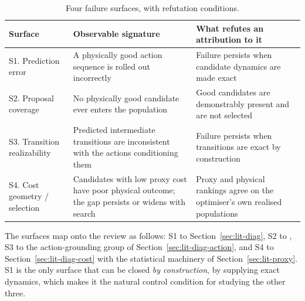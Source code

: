 \documentclass[11pt,letterpaper]{article}
\begin{document}
\begin{table}[t]
\centering\small
\caption{Four failure surfaces, with refutation conditions.}\label{tab:surfaces}
\begin{tabularx}{\textwidth}{@{}L{2.5cm} L{4.0cm} Y@{}}
\toprule
Surface & Observable signature & What refutes an attribution to it \\
\midrule
S1. Prediction error & A physically good action sequence is rolled out
incorrectly & Failure persists when candidate dynamics are made exact \\
S2. Proposal coverage & No physically good candidate ever enters the population &
Good candidates are demonstrably present and are not selected \\
S3. Transition realizability & Predicted intermediate transitions are inconsistent
with the actions conditioning them & Failure persists when transitions are exact
by construction \\
S4. Cost geometry / selection & Candidates with low proxy cost have poor physical
outcome; the gap persists or widens with search & Proxy and physical rankings
agree on the optimiser's own realised populations \\
\bottomrule
\end{tabularx}
\end{table}

The surfaces map onto the review as follows: S1 to
Section~\ref{sec:lit-diag}, S2 to \citet{imwm2026}, S3 to the
action-grounding group of Section~\ref{sec:lit-diag-action}, and S4 to
Section~\ref{sec:lit-diag-cost} with the statistical machinery of
Section~\ref{sec:lit-proxy}. S1 is the only surface that can be closed
\emph{by construction}, by supplying exact dynamics, which makes it the
natural control condition for studying the other three.
\end{document}
